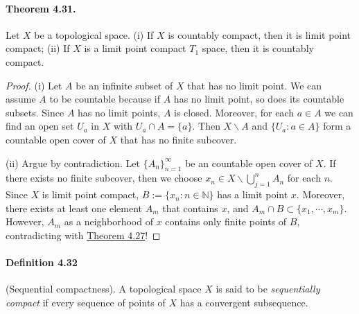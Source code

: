 \documentclass{article}
\numberwithin{equation}{section}
\theoremstyle{plain}
\theoremstyle{definition}
\begin{document}
\paragraph{Theorem 4.31.\label{thm:4.31}} Let $X$ be a topological space. (i) If $X$ is countably compact, then it is limit point compact;
(ii) If $X$ is a limit point compact $T_1$ space, then it is countably compact.
\begin{proof}
(i) Let $A$ be an infinite subset of $X$ that has no limit point. We can assume $A$ to be countable because if $A$ has no limit point, so does its countable subsets. Since $A$ has no limit points, $A$ is closed. Moreover, for each $a\in A$ we can find an open set $U_a$ in $X$ with $U_a\cap A=\{a\}$. Then $X\backslash A$ and $\{U_a: a\in A\}$ form a countable open cover of $X$ that has no finite subcover.

(ii) Argue by contradiction. Let $\{A_n\}_{n=1}^\infty$ be an countable open cover of $X$. If there exists no finite subcover, then we choose $x_n\in X\backslash\bigcup_{j=1}^n A_n$ for each $n$. Since $X$ is limit point compact, $B:=\{x_n:n\in\mathbb{N}\}$ has a limit point $x$. Moreover, there exists at least one element $A_m$ that contains $x$, and $A_m\cap B\subset\{x_1,\cdots,x_m\}$. However, $A_m$ as a neighborhood of $x$ contains only finite points of $B$, contradicting with \hyperref[thm:4.27]{Theorem 4.27}!
\end{proof}

\paragraph{Definition 4.32\label{def:4.32}} (Sequential compactness). A topological space $X$ is said to be \textit{sequentially compact} if every sequence of points of $X$ has a convergent subsequence.
\end{document}
